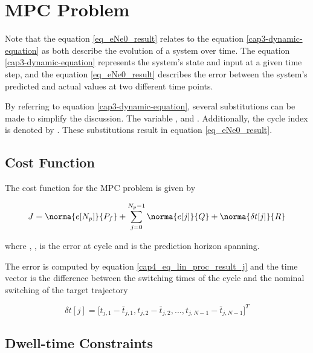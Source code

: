 \section{MPC Problem}

Note that the equation \eqref{eq_eNe0_result} relates to the equation \eqref{cap3-dynamic-equation} as both describe the evolution of a
system over time. The equation \eqref{cap3-dynamic-equation} represents the system's state and input at a given time step,
and the equation \eqref{eq_eNe0_result} describes the error between the system's predicted and actual values at two different time points.

By referring to equation \eqref{cap3-dynamic-equation}, several substitutions can be made to 
simplify the discussion. The variable , and . Additionally, the cycle index is denoted by . These substitutions result 
in equation \eqref{eq_eNe0_result}.
\subsection{Cost Function}

The cost function for the MPC problem is given by

\begin{equation}
\label{eq_cost_funcion}
    J = \norma{e[N_p]}{P_f} \\
    + \sum^{N_p - 1}_{j=0}\norma{e[j]}{Q} + \norma{\delta t[j]}{R}
\end{equation}

\noindent
where , ,  is the 
error at cycle  and  is the prediction horizon spanning.


The error  is computed by equation \eqref{cap4_eq_lin_proc_result_j} and the time vector
 is the difference between the switching times of the cycle and the nominal switching of the target trajectory  

\noindent
\begin{equation}
    \delta t[j] = \Big[t_{j,1} - \bar{t}_{j,1}, t_{j,2} - \bar{t}_{j,2}, ..., t_{j,N-1} - \bar{t}_{j,N-1}\Big]^T
\end{equation}

\subsection{Dwell-time Constraints}

